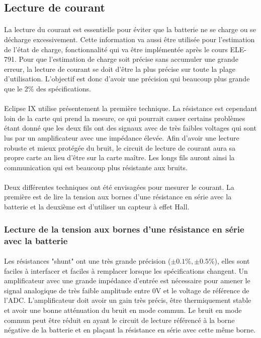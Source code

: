 \subsection{Lecture de courant}
	\paragraph*{}
	La lecture du courant est essentielle pour éviter que la batterie ne se charge ou se décharge excessivement. Cette information va aussi être utilisée pour l'estimation de l'état de charge, fonctionnalité qui va être implémentée après le cours ELE-791. Pour que l'estimation de charge soit précise sans accumuler une grande erreur, la lecture de courant se doit d'être la plus précise sur toute la plage d'utilisation. L'objectif est donc d'avoir une précision qui beaucoup plus grande que le 2\% des spécifications. 
	
	\paragraph*{}
	Eclipse IX utilise présentement la première technique. La résistance est cependant loin de la carte qui prend la mesure, ce qui pourrait causer certains problèmes étant donné que les deux fils ont des signaux avec de très faibles voltages qui sont lus par un amplificateur avec une impédance élevée. Afin d'avoir une lecture robuste et mieux protégée du bruit, le circuit de lecture de courant aura sa propre carte au lieu d'être sur la carte maître. Les longs fils auront ainsi la communication qui est beaucoup plus résistante aux bruits. 
	
	\paragraph*{}
	Deux différentes techniques ont été envisagées pour mesurer le courant. La première est de lire la tension aux bornes d'une résistance en série avec la batterie et la deuxième est d'utiliser un capteur à effet Hall. 
	
	
	\subsubsection*{Lecture de la tension aux bornes d'une résistance en série avec la batterie}
	\paragraph*{}
	Les résistances "shunt" ont une très grande précision ($\pm 0.1 \% , \pm 0.5 \%$), elles sont faciles à interfacer et faciles à remplacer lorsque les spécifications changent. Un amplificateur avec une grande impédance d'entrée est nécessaire pour amener le signal analogique de très faible amplitude entre 0V et le voltage de référence de l'ADC. L'amplificateur doit avoir un gain très précis, être thermiquement stable et avoir une bonne atténuation du bruit en mode commun. Le bruit en mode commun peut être réduit en ayant le circuit de lecture référencé à la borne négative de la batterie et en plaçant la résistance en série avec cette même borne.
		
